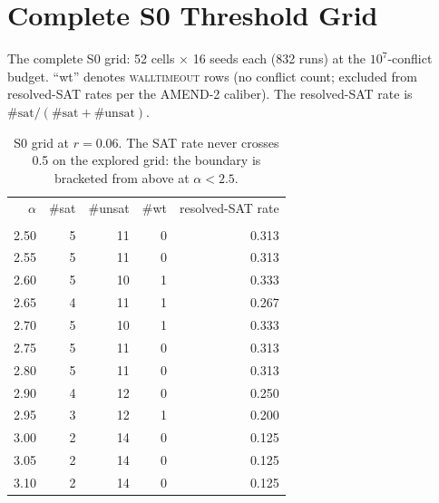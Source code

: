 \documentclass[manuscript, screen, review]{jair}
\begin{document}
\printbibliography

\appendix

\section{Complete S0 Threshold Grid}
\label{app:s0grid}

The complete S0 grid: 52 cells $\times$ 16 seeds each (832 runs) at the
$10^7$-conflict budget. ``wt'' denotes \textsc{walltimeout} rows (no conflict
count; excluded from resolved-SAT rates per the AMEND-2 caliber). The
resolved-SAT rate is $\#\text{sat}/(\#\text{sat}+\#\text{unsat})$.

\begin{table}[h]
\centering
\caption{S0 grid at $r=0.06$. The SAT rate never crosses 0.5 on the explored
grid: the boundary is bracketed from above at $\alpha<2.5$.}
\begin{tabular}{rrrrr}
\toprule
$\alpha$ & \#sat & \#unsat & \#wt & resolved-SAT rate\\
\addlinespace
\multicolumn{5}{l}{\emph{$r=0.06$ (12 cells; boundary bracketed below 2.5)}}\\
2.50 & 5 & 11 & 0 & 0.313\\
2.55 & 5 & 11 & 0 & 0.313\\
2.60 & 5 & 10 & 1 & 0.333\\
2.65 & 4 & 11 & 1 & 0.267\\
2.70 & 5 & 10 & 1 & 0.333\\
2.75 & 5 & 11 & 0 & 0.313\\
2.80 & 5 & 11 & 0 & 0.313\\
2.90 & 4 & 12 & 0 & 0.250\\
2.95 & 3 & 12 & 1 & 0.200\\
3.00 & 2 & 14 & 0 & 0.125\\
3.05 & 2 & 14 & 0 & 0.125\\
3.10 & 2 & 14 & 0 & 0.125\\
\bottomrule
\end{tabular}

\label{tab:s0r006}
\end{table}
\end{document}
